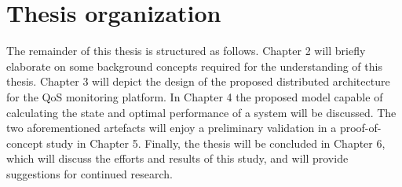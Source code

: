 \section{Thesis organization}
The remainder of this thesis is structured as follows. Chapter 2 will briefly elaborate on some background concepts required for the understanding of this thesis. Chapter 3 will depict the design of the proposed distributed architecture for the QoS monitoring platform. In Chapter 4 the proposed model capable of calculating the state and optimal performance of a system will be discussed. The two aforementioned artefacts will enjoy a preliminary validation in a proof-of-concept study in Chapter 5. Finally, the thesis will be concluded in Chapter 6, which will discuss the efforts and results of this study, and will provide suggestions for continued research.

